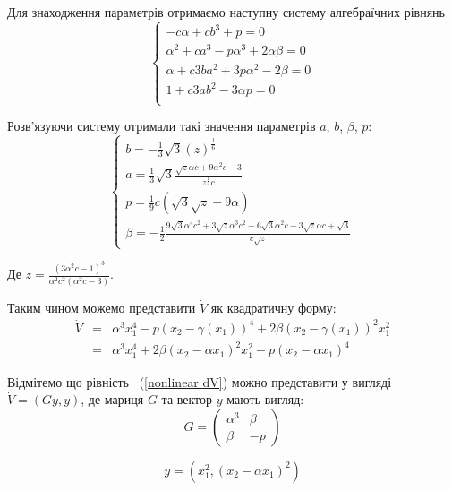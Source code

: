 \documentclass{article}
\begin{document}
Для знаходження параметрів отримаємо наступну систему алгебраїчних рівнянь 
\begin{equation}
    \begin{cases}
        -c\alpha+cb^3+p=0\\
        \alpha^2+ca^3-p\alpha^3+2\alpha\beta=0\\
        \alpha+c3ba^2+3p\alpha^2-2\beta=0\\
        1+c3ab^2-3\alpha p=0\\
    \end{cases}
\end{equation}

Розв'язуючи  систему отримали такі значення параметрів $a$, $b$, $\beta$, $p$: 
\begin{equation}
    \begin{cases}
        b = -\frac{1}{3}\sqrt{3}
            (z)^{\frac{1}{6}}\\
        a=  \frac{1}{3}\sqrt{3}\frac{ \sqrt{z} \alpha c+9\alpha^2 c-3}
        {z^{\frac{1}{3}}c}\\
        p= \frac{1}{9}c(\sqrt{3}\sqrt{z}+9\alpha)\\
        \beta = -\frac{1}{2} 
        \frac{9\sqrt{3}\alpha^4c^2+3\sqrt{z}\alpha^3c^2
        -6\sqrt{3}\alpha^{2}c - 3\sqrt{z}\alpha c +\sqrt{3}
        }{c\sqrt{z}}
    \end{cases}
\end{equation}

Де $z = \frac{(3\alpha^2c-1)^3}{\alpha^2c^2(\alpha^2c-3)}$.

Таким чином можемо представити $\dot V$ як квадратичну форму:
\begin{eqnarray}\label{nonlinear dV}
    \dot V &=& \alpha^3x_{1}^4 - p(x_2-\gamma(x_1))^4
    +2\beta(x_2-\gamma(x_1))^2x_{1}^2\nonumber\\ 
    &=&\alpha^3x_{1}^4 + 2\beta(x_2-\alpha x_1)^2x_{1}^2
    -p(x_2-\alpha x_1)^4
\end{eqnarray}

Відмітемо що рівність ~(\ref{nonlinear dV}) можно представити у вигляді $\dot V =(Gy,y)$, де 
мариця $G$ та вектор $y$ мають вигляд: 
\begin{equation}
G=\left(\begin{array}{clr}
    \alpha^3 & \beta\\
    \beta & -p
\end{array}\right) 
\end{equation}

\begin{equation}
    y=(x_{1}^2,(x_2-\alpha x_{1})^2)
\end{equation}
\end{document}
